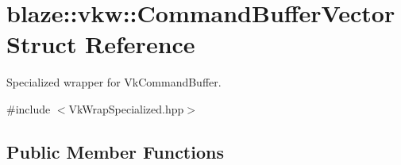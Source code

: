 \hypertarget{structblaze_1_1vkw_1_1CommandBufferVector}{}\section{blaze\+:\+:vkw\+:\+:Command\+Buffer\+Vector Struct Reference}
\label{structblaze_1_1vkw_1_1CommandBufferVector}


Specialized wrapper for Vk\+Command\+Buffer.  




{\ttfamily \#include $<$Vk\+Wrap\+Specialized.\+hpp$>$}

\subsection*{Public Member Functions}
